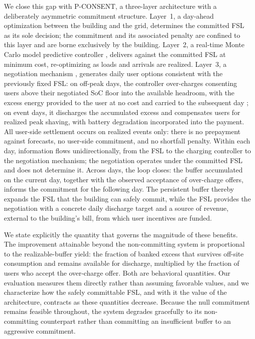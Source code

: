 We close this gap with P-CONSENT, a three-layer architecture with a
deliberately asymmetric commitment structure. Layer~1, a day-ahead
optimization between the building and the grid, determines the committed
FSL as its sole decision; the commitment and its associated penalty are
confined to this layer and are borne exclusively by the building. Layer~2,
a real-time Monte Carlo model predictive controller ,
delivers against the committed FSL at minimum cost, re-optimizing as loads
and arrivals are realized. Layer~3, a negotiation mechanism \cite{sen2026consent},
generates daily user options consistent with the previously fixed FSL: on
off-peak days, the controller over-charges consenting users above their
negotiated SoC floor into the available headroom, with the excess energy
provided to the user at no cost and carried to the subsequent day \cite{sen2026negotiations}; on event days, it discharges the accumulated excess and compensates
users for realized peak shaving, with battery degradation incorporated into
the payment. All user-side settlement occurs on realized events only: there
is no prepayment against forecasts, no user-side commitment, and no
shortfall penalty. Within each day, information flows unidirectionally,
from the FSL to the charging controller to the negotiation mechanism; the
negotiation operates under the committed FSL and does not determine it. Across
days, the loop closes: the buffer accumulated on the current day, together
with the observed acceptance of over-charge offers, informs the commitment for
the following day. The persistent buffer thereby expands the FSL that the
building can safely commit, while the FSL provides the negotiation with a
concrete daily discharge target and a source of revenue, external to the
building's bill, from which user incentives are funded.
 
We state explicitly the quantity that governs the magnitude of these
benefits. The improvement attainable beyond the non-committing system is
proportional to the realizable-buffer yield: the fraction of banked excess
that survives off-site consumption and remains available for discharge,
multiplied by the fraction of users who accept the over-charge offer. Both
are behavioral quantities. Our evaluation measures them directly rather
than assuming favorable values, and we characterize how the safely
committable FSL, and with it the value of the architecture, contracts as
these quantities decrease. Because the null commitment remains feasible
throughout, the system degrades gracefully to its non-committing
counterpart rather than committing an insufficient buffer to an aggressive
commitment.
 
